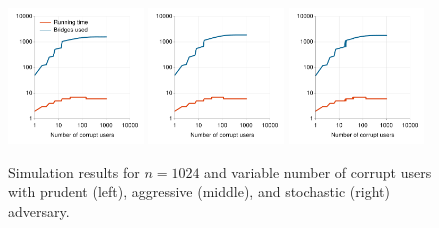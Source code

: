\documentclass[USenglish,oneside,twocolumn]{article}
\begin{document}
\begin{figure}[t]
	\hspace{-0.4em}
	\includegraphics[width=0.32\textwidth]{images/plot-prudent-VarT-1024}	
	\hspace{0.3em}
	\includegraphics[width=0.32\textwidth]{images/plot-aggressive-VarT-1024}	
	\hspace{0.3em}
	\includegraphics[width=0.32\textwidth]{images/plot-stochastic-VarT-1024}
	\caption{Simulation results for ${n=1024}$ and variable number of corrupt users with prudent (left), aggressive (middle), and stochastic (right) adversary.}
	\label{fig:plot2} 
\end{figure}

\end{document}
